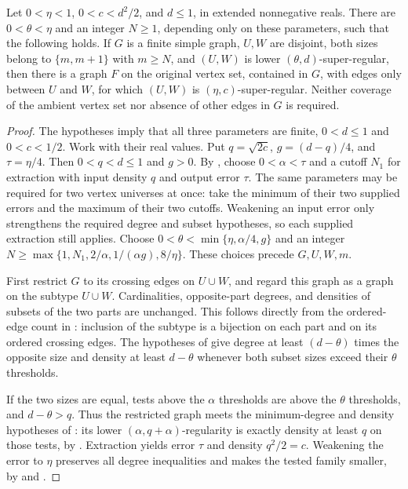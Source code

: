 \begin{lemma}
Let $0<\eta<1$, $0<c<d^2/2$, and $d\leq1$, in extended
nonnegative reals. There are $0<\theta<\eta$ and an integer $N\geq1$,
depending only on these parameters, such that the following holds.
If $G$ is a finite simple graph, $U,W$ are disjoint, both sizes belong
to $\{m,m+1\}$ with $m\geq N$, and $(U,W)$ is lower
$(\theta,d)$-super-regular, then there is a graph $F$ on the original
vertex set, contained in $G$, with edges only between $U$ and $W$, for
which $(U,W)$ is $(\eta,c)$-super-regular. Neither coverage of the
ambient vertex set nor absence of other edges in $G$ is required.
\end{lemma}
\begin{proof}
The hypotheses imply that all three parameters are finite,
$0<d\leq1$ and $0<c<1/2$. Work with their real values. Put
$q=\sqrt{2c}$, $g=(d-q)/4$, and $\tau=\eta/4$.
Then $0<q<d\leq1$ and $g>0$. By ,
choose $0<\alpha<\tau$ and a cutoff $N_1$ for extraction with
input density $q$ and output error $\tau$. The same parameters may
be required for two vertex universes at once: take the minimum of
their two supplied errors and the maximum of their two cutoffs.
Weakening an input error only strengthens the required degree and
subset hypotheses, so each supplied extraction still applies.
Choose $0<\theta<\min\{\eta,\alpha/4,g\}$ and an integer
$N\geq\max\{1,N_1,2/\alpha,1/(\alpha g),8/\eta\}$.
These choices precede $G,U,W,m$.

First restrict $G$ to its crossing edges on $U\cup W$, and regard
this graph as a graph on the subtype $U\cup W$. Cardinalities,
opposite-part degrees, and densities of subsets of the two parts are
unchanged. This follows directly from the ordered-edge count in
: inclusion of the subtype is a bijection on
each part and on its ordered crossing edges.
The hypotheses of  give degree
at least $(d-\theta)$ times the opposite size and density at least
$d-\theta$ whenever both subset sizes exceed their $\theta$ thresholds.

If the two sizes are equal, tests above the $\alpha$ thresholds
are above the $\theta$ thresholds, and $d-\theta>q$.
Thus the restricted graph meets the minimum-degree and density
hypotheses of : its lower
$(\alpha,q+\alpha)$-regularity is exactly density at least $q$
on those tests, by . Extraction yields
error $\tau$ and density $q^2/2=c$. Weakening the error to $\eta$
preserves all degree inequalities and makes the tested family smaller,
by  and .


\end{proof}
